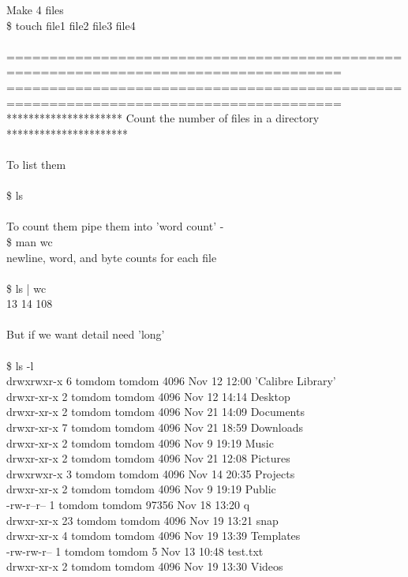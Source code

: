 \documentclass[10pt,a4paper]{article}
\begin{document}
{\large Make 4 files\\
\$ touch file1 file2 file3 file4\\
\\
=====================================================================================\\
=====================================================================================\\
*********************  Count the number of files in a directory   **********************\\
\\
To list them\\
\\
\$ ls\\
\\
To count them pipe them into  'word count' - \\
\$ man wc\\
newline, word, and byte counts for each file\\
\\
\$ ls | wc\\
     13      14     108\\
\\
But if we want detail need 'long'\\
\\
\$ ls -l\\
drwxrwxr-x  6 tomdom tomdom  4096 Nov 12 12:00 'Calibre Library'\\
drwxr-xr-x  2 tomdom tomdom  4096 Nov 12 14:14  Desktop\\
drwxr-xr-x  2 tomdom tomdom  4096 Nov 21 14:09  Documents\\
drwxr-xr-x  7 tomdom tomdom  4096 Nov 21 18:59  Downloads\\
drwxr-xr-x  2 tomdom tomdom  4096 Nov  9 19:19  Music\\
drwxr-xr-x  2 tomdom tomdom  4096 Nov 21 12:08  Pictures\\
drwxrwxr-x  3 tomdom tomdom  4096 Nov 14 20:35  Projects\\
drwxr-xr-x  2 tomdom tomdom  4096 Nov  9 19:19  Public\\
-rw-r--r--  1 tomdom tomdom 97356 Nov 18 13:20  q\\
drwxr-xr-x 23 tomdom tomdom  4096 Nov 19 13:21  snap\\
drwxr-xr-x  4 tomdom tomdom  4096 Nov 19 13:39  Templates\\
-rw-rw-r--  1 tomdom tomdom     5 Nov 13 10:48  test.txt\\
drwxr-xr-x  2 tomdom tomdom  4096 Nov 19 13:30  Videos\\
}
\end{document}

